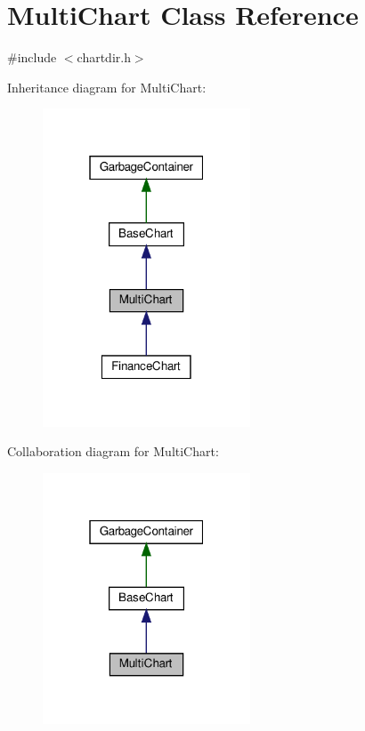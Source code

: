 \hypertarget{class_multi_chart}{}\section{Multi\+Chart Class Reference}
\label{class_multi_chart}


{\ttfamily \#include $<$chartdir.\+h$>$}



Inheritance diagram for Multi\+Chart\+:
\nopagebreak
\begin{figure}[H]
\begin{center}
\leavevmode
\includegraphics[width=175pt]{class_multi_chart__inherit__graph}
\end{center}
\end{figure}


Collaboration diagram for Multi\+Chart\+:
\nopagebreak
\begin{figure}[H]
\begin{center}
\leavevmode
\includegraphics[width=175pt]{class_multi_chart__coll__graph}
\end{center}
\end{figure}
